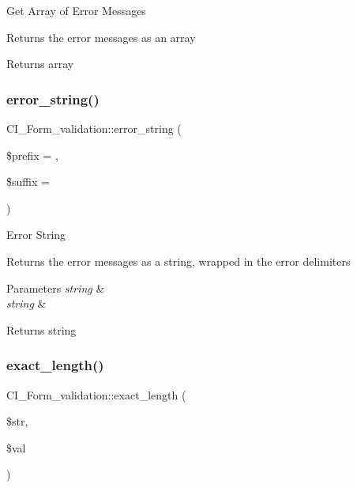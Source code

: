 Get Array of Error Messages

Returns the error messages as an array

\begin{DoxyReturn}{Returns}
array 
\end{DoxyReturn}
\mbox{\label{class_c_i___form__validation_a6862368ee2a08742bf381d10ea7f5439}} 
\subsubsection{\texorpdfstring{error\+\_\+string()}{error\_string()}}
{\footnotesize\ttfamily C\+I\+\_\+\+Form\+\_\+validation\+::error\+\_\+string (\begin{DoxyParamCaption}\item[{}]{\$prefix = {\ttfamily \textquotesingle{}\textquotesingle{}},  }\item[{}]{\$suffix = {\ttfamily \textquotesingle{}\textquotesingle{}} }\end{DoxyParamCaption})}

Error String

Returns the error messages as a string, wrapped in the error delimiters


\begin{DoxyParams}{Parameters}
{\em string} & \\
\hline
{\em string} & \\
\hline
\end{DoxyParams}
\begin{DoxyReturn}{Returns}
string 
\end{DoxyReturn}
\mbox{\label{class_c_i___form__validation_af5c3a592db50ae4588ebfac80ca5bc97}} 
\subsubsection{\texorpdfstring{exact\+\_\+length()}{exact\_length()}}
{\footnotesize\ttfamily C\+I\+\_\+\+Form\+\_\+validation\+::exact\+\_\+length (\begin{DoxyParamCaption}\item[{}]{\$str,  }\item[{}]{\$val }\end{DoxyParamCaption})}

